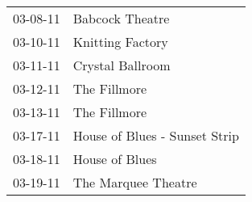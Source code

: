 \begin{supertabular}{p{0.07\textwidth}p{0.23\textwidth}}
 03-08-11 &                Babcock Theatre \\
 03-10-11 &               Knitting Factory \\
 03-11-11 &               Crystal Ballroom \\
 03-12-11 &                   The Fillmore \\
 03-13-11 &                   The Fillmore \\
 03-17-11 &  House of Blues - Sunset Strip \\
 03-18-11 &                 House of Blues \\
 03-19-11 &            The Marquee Theatre \\
\end{supertabular}
